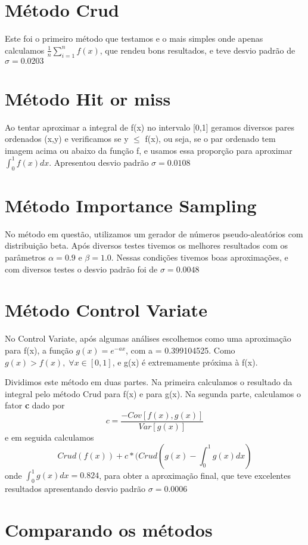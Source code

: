 \documentclass{article}
\begin{document}
\section{Método Crud}
Este foi o primeiro método que testamos e o mais simples onde apenas calculamos $\frac{1}{n}\sum_{i=1}^n f(x)$, que rendeu bons resultados, e teve desvio padrão de $\sigma = 0.0203$
        

\section{Método Hit or miss}
Ao tentar aproximar a integral de f(x) no intervalo [0,1] geramos diversos pares ordenados (x,y) e verificamos se y $\leq$ f(x), ou seja, se o par ordenado tem imagem acima ou abaixo da função f, e usamos essa proporção para aproximar $\int_0^1 f(x)dx$. Apresentou desvio padrão $\sigma = 0.0108$ 

\section{Método Importance Sampling}
No método em questão, utilizamos um gerador de números pseudo-aleatórios com distribuição beta. Após diversos testes tivemos os melhores resultados com os parâmetros $ \alpha = 0.9 $ e $ \beta = 1.0 $. Nessas condições tivemos boas aproximações, e com diversos testes o desvio padrão foi de $ \sigma = 0.0048$

\section{Método Control Variate}
No Control Variate, após algumas análises escolhemos como uma aproximação para f(x), a função $ g(x) = e ^ {-ax}$, com a = 0.399104525. Como $ g(x) > f(x), \; \forall x \in [0,1] $, e g(x) é extremamente próxima à f(x).
\par
Dividimos este método em duas partes. Na primeira calculamos o resultado da integral pelo método Crud para f(x) e para g(x). Na segunda parte, calculamos o fator \textbf{c} dado por $$c = \frac{-Cov[f(x),g(x)]}{Var[g(x)]}$$ e em seguida calculamos $$Crud(f(x)) + c * (Crud(g(x) - \int_0^1 g(x) dx )$$ onde $\int_0^1 g(x) dx = 0.824$, para obter a aproximação final, que teve excelentes resultados apresentando desvio padrão $\sigma = 0.0006$

\section{Comparando os métodos}
\end{document}
